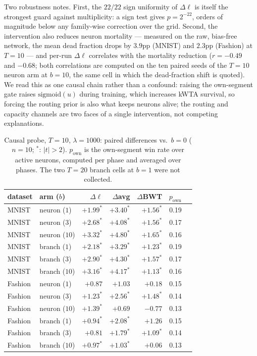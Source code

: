 \documentclass[review,12pt,number]{elsarticle}
\newcommand{\own}{p_{\mathrm{own}}}
\begin{document}
Two robustness notes. First, the $22/22$ sign uniformity of $\Delta\ell$
is itself the strongest guard against multiplicity: a sign test gives
$p = 2^{-22}$, orders of magnitude below any family-wise correction over
the grid. Second, the intervention also reduces neuron mortality ---
measured on the raw, bias-free network, the mean dead fraction drops by
$3.9$pp (MNIST) and $2.3$pp (Fashion) at $T{=}10$ --- and per-run
$\Delta\ell$ correlates with the mortality reduction ($r{=}-0.49$ and
$-0.68$; both correlations are computed on the ten paired seeds of the
$T{=}10$ neuron arm at $b{=}10$, the same cell in which the dead-fraction
shift is quoted). We read this as one causal chain rather than a confound:
raising the own-segment gate raises $\mathrm{sigmoid}(u)$ during
training, which increases kWTA survival, so forcing the routing prior is
also what keeps neurons alive; the routing and capacity channels are two
faces of a single intervention, not competing explanations.

\begin{table}[t]
\centering\small
\caption{Causal probe, $T{=}10$, $\lambda{=}1000$: paired differences vs.\
$b{=}0$ ($n{=}10$; $^{*}$: $|t|>2$). $\own$ is the own-segment win rate
over active neurons, computed per phase and averaged over phases. The two
$T{=}20$ branch cells at $b{=}1$ were not collected.}
\label{tab:dose10}
\begin{tabular}{llrrrr r}
\toprule
dataset & arm ($b$) & $\Delta\ell$ & $\Delta$avg & $\Delta$BWT & $\own$ \\
\midrule
MNIST & neuron ($1$)  & $+1.99^{*}$ & $+3.40^{*}$ & $+1.56^{*}$ & 0.19 \\
MNIST & neuron ($3$)  & $+2.68^{*}$ & $+4.08^{*}$ & $+1.56^{*}$ & 0.17 \\
MNIST & neuron ($10$) & $+3.32^{*}$ & $+4.80^{*}$ & $+1.65^{*}$ & 0.16 \\
MNIST & branch ($1$)  & $+2.18^{*}$ & $+3.29^{*}$ & $+1.23^{*}$ & 0.19 \\
MNIST & branch ($3$)  & $+2.90^{*}$ & $+4.30^{*}$ & $+1.57^{*}$ & 0.17 \\
MNIST & branch ($10$) & $+3.16^{*}$ & $+4.17^{*}$ & $+1.13^{*}$ & 0.16 \\
Fashion & neuron ($1$)  & $+0.87$ & $+1.03$ & $+0.18$ & 0.15 \\
Fashion & neuron ($3$)  & $+1.23^{*}$ & $+2.56^{*}$ & $+1.48^{*}$ & 0.14 \\
Fashion & neuron ($10$) & $+1.39^{*}$ & $+0.69$ & $-0.77$ & 0.13 \\
Fashion & branch ($1$)  & $+0.94^{*}$ & $+2.08^{*}$ & $+1.26$ & 0.15 \\
Fashion & branch ($3$)  & $+0.81$ & $+1.79^{*}$ & $+1.09^{*}$ & 0.14 \\
Fashion & branch ($10$) & $+0.97^{*}$ & $+1.03^{*}$ & $+0.06$ & 0.13 \\
\bottomrule
\end{tabular}
\end{table}
\end{document}

